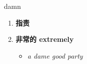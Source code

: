 
\begin{frame}
{\huge damn}
\begin{center}
\begin{enumerate}\Large
  \item \textbf{指责}
  \item \textbf{非常的 extremely}
  \begin{itemize}
    \item \em{\Large{a dame good party}}
  \end{itemize}
\end{enumerate}
\end{center}
\end{frame}
